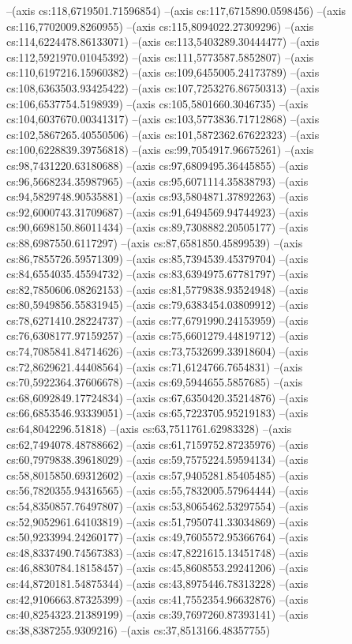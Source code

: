 --(axis cs:118,6719501.71596854)
--(axis cs:117,6715890.0598456)
--(axis cs:116,7702009.8260955)
--(axis cs:115,8094022.27309296)
--(axis cs:114,6224478.86133071)
--(axis cs:113,5403289.30444477)
--(axis cs:112,5921970.01045392)
--(axis cs:111,5773587.5852807)
--(axis cs:110,6197216.15960382)
--(axis cs:109,6455005.24173789)
--(axis cs:108,6363503.93425422)
--(axis cs:107,7253276.86750313)
--(axis cs:106,6537754.5198939)
--(axis cs:105,5801660.3046735)
--(axis cs:104,6037670.00341317)
--(axis cs:103,5773836.71712868)
--(axis cs:102,5867265.40550506)
--(axis cs:101,5872362.67622323)
--(axis cs:100,6228839.39756818)
--(axis cs:99,7054917.96675261)
--(axis cs:98,7431220.63180688)
--(axis cs:97,6809495.36445855)
--(axis cs:96,5668234.35987965)
--(axis cs:95,6071114.35838793)
--(axis cs:94,5829748.90535881)
--(axis cs:93,5804871.37892263)
--(axis cs:92,6000743.31709687)
--(axis cs:91,6494569.94744923)
--(axis cs:90,6698150.86011434)
--(axis cs:89,7308882.20505177)
--(axis cs:88,6987550.6117297)
--(axis cs:87,6581850.45899539)
--(axis cs:86,7855726.59571309)
--(axis cs:85,7394539.45379704)
--(axis cs:84,6554035.45594732)
--(axis cs:83,6394975.67781797)
--(axis cs:82,7850606.08262153)
--(axis cs:81,5779838.93524948)
--(axis cs:80,5949856.55831945)
--(axis cs:79,6383454.03809912)
--(axis cs:78,6271410.28224737)
--(axis cs:77,6791990.24153959)
--(axis cs:76,6308177.97159257)
--(axis cs:75,6601279.44819712)
--(axis cs:74,7085841.84714626)
--(axis cs:73,7532699.33918604)
--(axis cs:72,8629621.44408564)
--(axis cs:71,6124766.7654831)
--(axis cs:70,5922364.37606678)
--(axis cs:69,5944655.5857685)
--(axis cs:68,6092849.17724834)
--(axis cs:67,6350420.35214876)
--(axis cs:66,6853546.93339051)
--(axis cs:65,7223705.95219183)
--(axis cs:64,8042296.51818)
--(axis cs:63,7511761.62983328)
--(axis cs:62,7494078.48788662)
--(axis cs:61,7159752.87235976)
--(axis cs:60,7979838.39618029)
--(axis cs:59,7575224.59594134)
--(axis cs:58,8015850.69312602)
--(axis cs:57,9405281.85405485)
--(axis cs:56,7820355.94316565)
--(axis cs:55,7832005.57964444)
--(axis cs:54,8350857.76497807)
--(axis cs:53,8065462.53297554)
--(axis cs:52,9052961.64103819)
--(axis cs:51,7950741.33034869)
--(axis cs:50,9233994.24260177)
--(axis cs:49,7605572.95366764)
--(axis cs:48,8337490.74567383)
--(axis cs:47,8221615.13451748)
--(axis cs:46,8830784.18158457)
--(axis cs:45,8608553.29241206)
--(axis cs:44,8720181.54875344)
--(axis cs:43,8975446.78313228)
--(axis cs:42,9106663.87325399)
--(axis cs:41,7552354.96632876)
--(axis cs:40,8254323.21389199)
--(axis cs:39,7697260.87393141)
--(axis cs:38,8387255.9309216)
--(axis cs:37,8513166.48357755)
